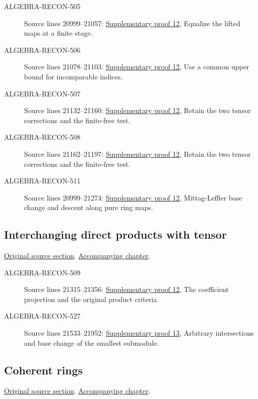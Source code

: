\begin{description}
\item[ALGEBRA-RECON-505] Source lines 20999--21057: \hyperlink{algebra_ml_review_notes_20260927}{Supplementary proof 12}, Equalize the lifted maps at a finite stage.
\item[ALGEBRA-RECON-506] Source lines 21078--21103: \hyperlink{algebra_ml_review_notes_20260927}{Supplementary proof 12}, Use a common upper bound for incomparable indices.
\item[ALGEBRA-RECON-507] Source lines 21132--21160: \hyperlink{algebra_ml_review_notes_20260927}{Supplementary proof 12}, Retain the two tensor corrections and the finite-free test.
\item[ALGEBRA-RECON-508] Source lines 21162--21197: \hyperlink{algebra_ml_review_notes_20260927}{Supplementary proof 12}, Retain the two tensor corrections and the finite-free test.
\item[ALGEBRA-RECON-511] Source lines 20999--21274: \hyperlink{algebra_ml_review_notes_20260927}{Supplementary proof 12}, Mittag-Leffler base change and descent along pure ring maps.
\end{description}

\subsection{Interchanging direct products with tensor}
\hypertarget{algebra-source-section-products-tensor}{}
\noindent\href{https://github.com/stacks/stacks-project/blob/a04446e57ec1fbc252a871afcec7752fb2807b14/algebra.tex\#L21277}{Original source section}. \href{algebra.pdf\#nameddest=section-products-tensor}{Accompanying chapter}.

\begin{description}
\item[ALGEBRA-RECON-509] Source lines 21315--21356: \hyperlink{algebra_ml_review_notes_20260927}{Supplementary proof 12}, The coefficient projection and the original product criteria.
\item[ALGEBRA-RECON-527] Source lines 21533--21952: \hyperlink{algebra_ml_coherent_notes_20260927}{Supplementary proof 13}, Arbitrary intersections and base change of the smallest submodule.
\end{description}

\subsection{Coherent rings}
\hypertarget{algebra-source-section-coherent}{}
\noindent\href{https://github.com/stacks/stacks-project/blob/a04446e57ec1fbc252a871afcec7752fb2807b14/algebra.tex\#L21690}{Original source section}. \href{algebra.pdf\#nameddest=section-coherent}{Accompanying chapter}.

